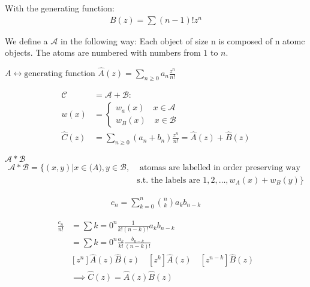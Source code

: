With the generating function: 
\begin{align*}
    B(z) = \sum (n-1)! z^n
\end{align*}

\begin{definition}
We define a  $\mathcal{A}$ in the following way: Each object of size n is composed of n atomc objects. The atoms are numbered with numbers from $1$ to $n$. 
\end{definition}
$A \leftrightarrow \text{generating function } \hat{A}(z) = \sum_{n\geq 0} a_n \frac{z^n}{n!}$

\begin{align*}
    \mathcal{C} &= \mathcal{A}+\mathcal{B}: \\
         w(x) &= \begin{cases}
                w_a(x) \quad x\in \mathcal{A}\\
                w_B(x) \quad x\in \mathcal{B}
				\end{cases}\\
    \hat{C}(z) &= \sum_{n\geq 0} (a_n+b_n) \frac{z^n}{n!}
        = \hat{A}(z) + \hat{B}(z)
\end{align*}

\begin{definition}

$\mathcal{A} * \mathcal{B}$ \\
\begin{align*}
\mathcal{A} * \mathcal{B} = \{ (x,y) | x \in \mathcal(A), y \in \mathcal{B}, &\text{ atomas are labelled in order preserving way }\\
 &\text{s.t. the labels are } 1,2, \dotsc , w_A(x) + w_B(y) \}
\end{align*}


\end{definition}

\begin{align*}
    c_n = \sum_{k=0}^{n} {n \choose k} a_k b_{n-k}
\end{align*}


\begin{align*}
    \frac{c_n}{n!} &= \sum{k=0}^{n} \frac{1}{k!(n-k)!} a_k b_{n-k}\\
    &= \sum{k=0}^{n} \frac{a_k}{k!} \frac{b_{n-k}}{(n-k)!} \\
    &[z^n] \hat{A}(z)\hat{B}(z) 
        \quad [z^k] \hat{A}(z) 
        \quad [z^{n-k}] \hat{B}(z) \\
    &\implies \hat{C}(z) = \hat{A}(z) \hat{B}(z) \\
\end{align*}

